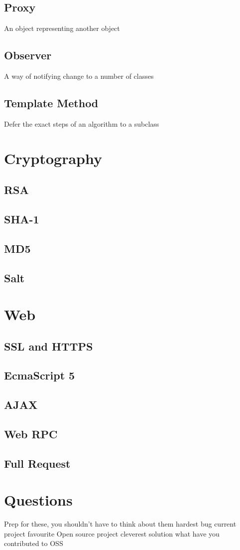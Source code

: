 \documentclass{article}
\begin{document}
		\subsection{Proxy}
			An object representing another object
		\subsection{Observer}
			A way of notifying change to a number of classes
		\subsection{Template Method}
			Defer the exact steps of an algorithm to a subclass


\clearpage
\section{Cryptography}
	\subsection{RSA}
	\subsection{SHA-1}
	\subsection{MD5}
	\subsection{Salt}
\clearpage
\section{Web}
	\subsection{SSL and HTTPS}
	\subsection{EcmaScript 5}
	\subsection{AJAX}
	\subsection{Web RPC}
	\subsection{Full Request}
\clearpage
\section{Questions}
	Prep for these, you shouldn't have to think about them
	hardest bug
	current project
	favourite Open source project
	cleverest solution
	what have you contributed to OSS
\end{document}
